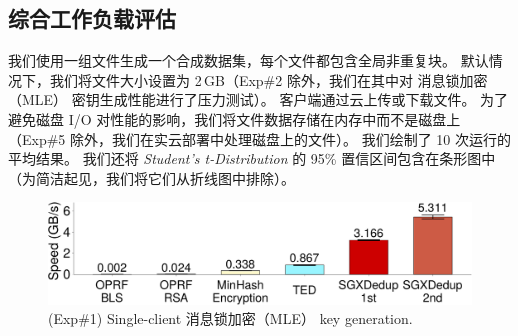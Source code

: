 \subsection{综合工作负载评估}
\label{subsec:sgxdedup-synthetic}


我们使用一组文件生成一个合成数据集，每个文件都包含全局非重复块。 默认情况下，我们将文件大小设置为 2\,GB（Exp\#2 除外，我们在其中对 消息锁加密（MLE） 密钥生成性能进行了压力测试）。 客户端通过云上传或下载文件。 为了避免磁盘 I/O 对性能的影响，我们将文件数据存储在内存中而不是磁盘上（Exp\#5 除外，我们在实云部署中处理磁盘上的文件）。 我们绘制了 10 次运行的平均结果。 我们还将 \textit{ Student's t-Distribution} 的 95\% 置信区间包含在条形图中（为简洁起见，我们将它们从折线图中排除）。


\begin{figure}[!htb]
\centering
\includegraphics[width=\textwidth]{pic/sgxdedup/expa2_keyGenPerformance.pdf}
\vspace{-12pt}
\caption{(Exp\#1) Single-client 消息锁加密（MLE） key generation.}
\label{fig:sgxdedup-keygen-comparison}
\end{figure}

